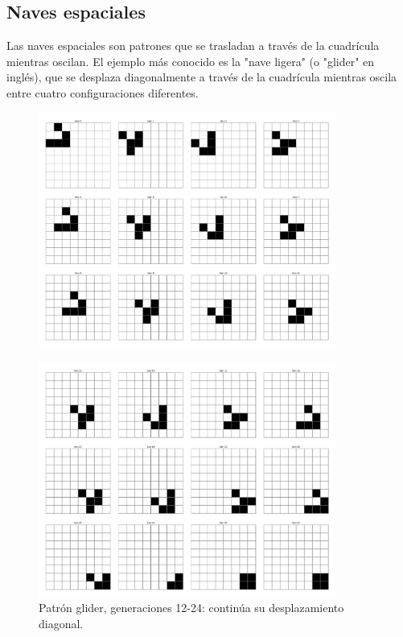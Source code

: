 \documentclass[]{article}
\begin{document}
\subsection{Naves espaciales}
Las naves espaciales son patrones que se trasladan a través de la cuadrícula mientras oscilan. El ejemplo más conocido es la "nave ligera" (o "glider" en inglés), que se desplaza diagonalmente a través de la cuadrícula mientras oscila entre cuatro configuraciones diferentes.
\begin{figure}[H]
  \centering
  \includegraphics[width=0.87\textwidth]{../assets/space_ships/glider/glider_12.jpg}

  \label{fig:glider}
\end{figure}
\vspace*{-10mm} %
\begin{figure}[H]
  \centering
  \includegraphics[width=0.87\textwidth]{../assets/space_ships/glider/glider_12_24.jpg}
  \caption{Patrón glider, generaciones 12-24: continúa su desplazamiento diagonal.}
  \label{fig:glider_12_24}
\end{figure}
\end{document}
